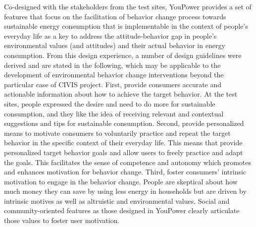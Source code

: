 Co-designed with the stakeholders from the test sites, YouPower provides a set of features that focus on the facilitation of behavior change process towards sustainable energy consumption that is implementable in the context of people's everyday life as a key to address the attitude-behavior gap \cite{Kollmuss2002,Schultz2002,Schultz2014} in people's environmental values (and attitudes) and their actual behavior in energy consumption. From this design experience, a number of design guidelines were derived and are stated in the following, which may be applicable to the development of environmental behavior change interventions beyond the particular case of CIVIS project. First, provide consumers accurate and actionable information about how to achieve the target behavior. At the test sites, people expressed the desire and need to do more for sustainable consumption, and they like the idea of receiving relevant and contextual suggestions and tips for sustainable consumption. 
Second, provide personalized means to motivate consumers to voluntarily practice and repeat the target behavior in the specific context of their everyday life. 
This means that provide personalized target behavior goals and allow users to freely practice and adapt the goals. 
This facilitates the sense of competence and autonomy which promotes and enhances motivation for behavior change. 
Third, foster consumers' intrinsic motivation to engage in the behavior change. 
People are skeptical about how much money they can save by using less energy in households but are driven by intrinsic motives as well as altruistic and environmental values. Social and community-oriented features as those designed in YouPower clearly articulate those values to foster user motivation. 


